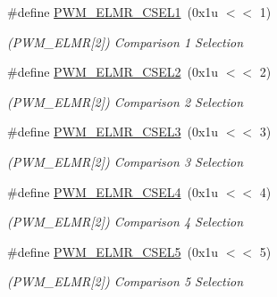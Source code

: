 \begin{DoxyCompactItemize}
\mbox{\label{group__SAME70__PWM_ga08f6b7258c6bc91e429811ccd14a8310}} 
\#define \mbox{\hyperlink{group__SAME70__PWM_ga08f6b7258c6bc91e429811ccd14a8310}{P\+W\+M\+\_\+\+E\+L\+M\+R\+\_\+\+C\+S\+E\+L1}}~(0x1u $<$$<$ 1)
\begin{DoxyCompactList}\small\item\em (P\+W\+M\+\_\+\+E\+L\+MR\mbox{[}2\mbox{]}) Comparison 1 Selection \end{DoxyCompactList}\item 
\mbox{\label{group__SAME70__PWM_gabec0c8acd271024f3e167e644a3d2d27}} 
\#define \mbox{\hyperlink{group__SAME70__PWM_gabec0c8acd271024f3e167e644a3d2d27}{P\+W\+M\+\_\+\+E\+L\+M\+R\+\_\+\+C\+S\+E\+L2}}~(0x1u $<$$<$ 2)
\begin{DoxyCompactList}\small\item\em (P\+W\+M\+\_\+\+E\+L\+MR\mbox{[}2\mbox{]}) Comparison 2 Selection \end{DoxyCompactList}\item 
\mbox{\label{group__SAME70__PWM_ga02f65ca00c0fbbfe5b44af28f6a73f63}} 
\#define \mbox{\hyperlink{group__SAME70__PWM_ga02f65ca00c0fbbfe5b44af28f6a73f63}{P\+W\+M\+\_\+\+E\+L\+M\+R\+\_\+\+C\+S\+E\+L3}}~(0x1u $<$$<$ 3)
\begin{DoxyCompactList}\small\item\em (P\+W\+M\+\_\+\+E\+L\+MR\mbox{[}2\mbox{]}) Comparison 3 Selection \end{DoxyCompactList}\item 
\mbox{\label{group__SAME70__PWM_ga5c0348a9525eb00101b564a982be4c8d}} 
\#define \mbox{\hyperlink{group__SAME70__PWM_ga5c0348a9525eb00101b564a982be4c8d}{P\+W\+M\+\_\+\+E\+L\+M\+R\+\_\+\+C\+S\+E\+L4}}~(0x1u $<$$<$ 4)
\begin{DoxyCompactList}\small\item\em (P\+W\+M\+\_\+\+E\+L\+MR\mbox{[}2\mbox{]}) Comparison 4 Selection \end{DoxyCompactList}\item 
\mbox{\label{group__SAME70__PWM_gafa8d31d1dfabab5ddc3c1d025f1e49a1}} 
\#define \mbox{\hyperlink{group__SAME70__PWM_gafa8d31d1dfabab5ddc3c1d025f1e49a1}{P\+W\+M\+\_\+\+E\+L\+M\+R\+\_\+\+C\+S\+E\+L5}}~(0x1u $<$$<$ 5)
\begin{DoxyCompactList}\small\item\em (P\+W\+M\+\_\+\+E\+L\+MR\mbox{[}2\mbox{]}) Comparison 5 Selection \end{DoxyCompactList}\item 
$$
\end{DoxyCompactItemize}
